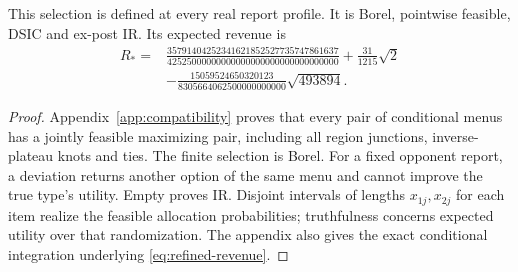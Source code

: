 \begin{proposition}\label{prop:refined-feasible}
This selection is defined at every real report profile. It is Borel,
pointwise feasible, DSIC and ex-post IR. Its expected revenue is
\begin{equation}\label{eq:refined-revenue}
\begin{split}
 R_*={}&\frac{35791404252341621852527735747861637}
 {42525000000000000000000000000000000}
 +\frac{31}{1215}\sqrt2\\
 &-\frac{15059524650320123}{8305664062500000000000}\sqrt{493894}.
\end{split}
\end{equation}
\end{proposition}
\begin{proof}
Appendix~\ref{app:compatibility} proves that every pair of conditional menus
has a jointly feasible maximizing pair, including all region junctions,
inverse-plateau knots and ties. The finite selection is Borel. For a fixed
opponent report, a deviation returns another option of the same menu and
cannot improve the true type's utility. Empty proves IR. Disjoint intervals
of lengths $x_{1j},x_{2j}$ for each item realize the feasible allocation
probabilities; truthfulness concerns expected utility over that randomization.
The appendix also gives the exact conditional integration underlying
\eqref{eq:refined-revenue}.
\end{proof}
